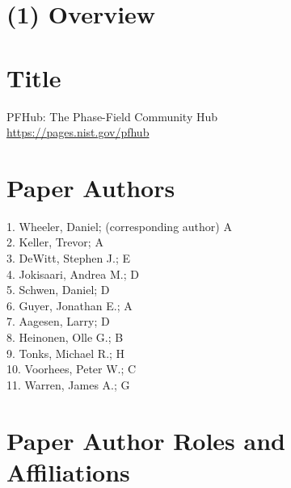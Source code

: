 \documentclass{jors}
\begin{document}
\newcommand\githublink[1]{\href{https://github.com/#1/}{\texttt{\textbf{@#1}}}}




\section*{(1) Overview}

\vspace{0.5cm}

\section*{Title}
\par\bigskip
PFHub: The Phase-Field Community Hub\\[\baselineskip]
\url{https://pages.nist.gov/pfhub}

\section*{Paper Authors}

1. Wheeler, Daniel; (corresponding author) A\\
2. Keller, Trevor; A\\
3. DeWitt, Stephen J.; E\\
4. Jokisaari, Andrea M.; D\\
5. Schwen, Daniel; D\\
6. Guyer, Jonathan E.; A\\
7. Aagesen, Larry; D\\
8. Heinonen, Olle G.; B\\
9. Tonks, Michael R.; H\\
10. Voorhees, Peter W.; C\\
11. Warren, James A.; G

\section*{Paper Author Roles and Affiliations}
\end{document}
